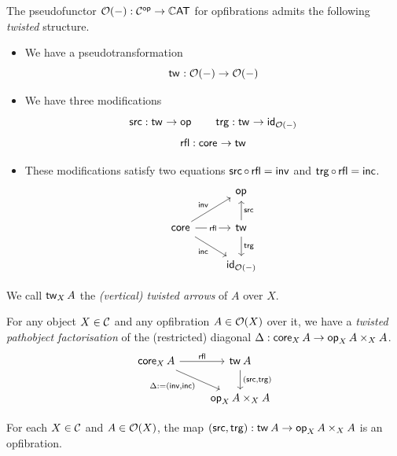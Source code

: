 \begin{axiom} \label{ax:twist}
  The pseudofunctor $\opfibcart(-) : \CC^\op \to \tCat$
  for opfibrations admits the following \emph{twisted} structure.
  \begin{itemize}
  \item We have a pseudotransformation 
    \[\vTw{} : \opfibcart(-) \to \opfibcart(-)\]
  \item We have three modifications
    \[ \src : \vTw{} \to \vOp{}
      \quad \quad
      \trg : \vTw{} \to \id_{\opfibcart(-)}  \]
    \[ \rfl : \vCore{} \to \vTw{} \]
  \item These modifications satisfy two equations
    $\src \circ \rfl = \inv$ and $\trg \circ \rfl = \inc$.
    \[
      \begin{tikzcd}
        & {\vOp{}} \\
        {\vCore{}} & {\vTw{}} \\
        & {\id_{\opfibcart(-)}}
        \arrow["\inv", from=2-1, to=1-2]
        \arrow["\rfl"{description}, from=2-1, to=2-2]
        \arrow["\inc"', from=2-1, to=3-2]
        \arrow["\src"', from=2-2, to=1-2]
        \arrow["\trg", from=2-2, to=3-2]
      \end{tikzcd}
    \]
  \end{itemize}
  We call $\vTw[X]{A}$ the \emph{(vertical) twisted arrows} of $A$ over $X$.
\end{axiom}

For any object $X \in \CC$ and any opfibration $A \in \opfibcart(X)$ over it,
we have a \emph{twisted pathobject factorisation} of the (restricted) diagonal
$\Delta : \vCore[X]{A} \to \vOp[X]{A} \times_X A$.
\[\begin{tikzcd}
	{\vCore[X] A} & {\vTw{A}} \\
	& {\vOp[X]{A} \times_X A}
	\arrow["\rfl", from=1-1, to=1-2]
	\arrow["{\Delta := (\inv,\inc)}"', from=1-1, to=2-2]
	\arrow["{(\src,\trg)}", from=1-2, to=2-2]
\end{tikzcd}\]

\begin{axiom}\label{ax:src-trg-opfibration}
  For each $X \in \CC$ and $A \in \opfibcart(X)$,
  the map $(\src,\trg) : \vTw{A} \to \vOp[X]{A} \times_X A$
  is an opfibration.
\end{axiom}

